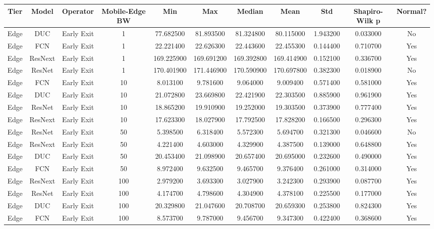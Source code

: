 \begin{tabular}{|c||c||c||c||c||c||c||c||c||c||c|}
\toprule
Tier & Model & Operator & Mobile-Edge BW & Min & Max & Median & Mean & Std & Shapiro-Wilk p & Normal? \\
\midrule
Edge & DUC & Early Exit & 1 & 77.682500 & 81.893500 & 81.324800 & 80.115000 & 1.943200 & 0.033000 & No \\
Edge & FCN & Early Exit & 1 & 22.221400 & 22.626300 & 22.443600 & 22.455300 & 0.144400 & 0.710700 & Yes \\
Edge & ResNext & Early Exit & 1 & 169.225900 & 169.691200 & 169.392800 & 169.414900 & 0.152100 & 0.336700 & Yes \\
Edge & ResNet & Early Exit & 1 & 170.401900 & 171.446900 & 170.590900 & 170.697800 & 0.382300 & 0.018900 & No \\
Edge & FCN & Early Exit & 10 & 8.013100 & 9.781600 & 9.064000 & 9.009400 & 0.571400 & 0.581000 & Yes \\
Edge & DUC & Early Exit & 10 & 21.072800 & 23.669800 & 22.421900 & 22.303500 & 0.885900 & 0.961900 & Yes \\
Edge & ResNet & Early Exit & 10 & 18.865200 & 19.910900 & 19.252000 & 19.303500 & 0.373900 & 0.777400 & Yes \\
Edge & ResNext & Early Exit & 10 & 17.623300 & 18.027900 & 17.792500 & 17.828200 & 0.166500 & 0.296300 & Yes \\
Edge & ResNet & Early Exit & 50 & 5.398500 & 6.318400 & 5.572300 & 5.694700 & 0.321300 & 0.046600 & No \\
Edge & ResNext & Early Exit & 50 & 4.221400 & 4.603000 & 4.329900 & 4.387500 & 0.139000 & 0.648800 & Yes \\
Edge & DUC & Early Exit & 50 & 20.453400 & 21.098900 & 20.657400 & 20.695000 & 0.232600 & 0.490000 & Yes \\
Edge & FCN & Early Exit & 50 & 8.972400 & 9.632500 & 9.465700 & 9.376400 & 0.261000 & 0.314000 & Yes \\
Edge & ResNext & Early Exit & 100 & 2.979200 & 3.693300 & 3.027900 & 3.242300 & 0.293900 & 0.087700 & Yes \\
Edge & ResNet & Early Exit & 100 & 4.174700 & 4.798600 & 4.304900 & 4.378100 & 0.225500 & 0.177000 & Yes \\
Edge & DUC & Early Exit & 100 & 20.329800 & 21.047600 & 20.708700 & 20.659300 & 0.253800 & 0.824300 & Yes \\
Edge & FCN & Early Exit & 100 & 8.573700 & 9.787000 & 9.456700 & 9.347300 & 0.422400 & 0.368600 & Yes \\

\end{tabular}
